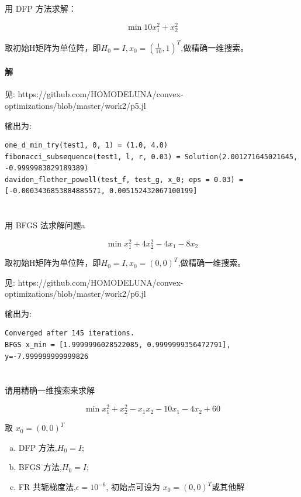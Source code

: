 \documentclass[a4paper]{article}
\begin{document}
\section{}

用 DFP 方法求解：

\[\min 10x_1^2 + x_2^2\]

取初始H矩阵为单位阵，即$H_0 = I, x_0 = (\frac{1}{10},1)^T$,做精确一维搜索。

\paragraph{解}

见: https://github.com/HOMODELUNA/convex-optimizations/blob/master/work2/p5.jl

输出为:
\begin{lstlisting}
one_d_min_try(test1, 0, 1) = (1.0, 4.0)
fibonacci_subsequence(test1, l, r, 0.03) = Solution(2.001271645021645, -0.9999983829189389)
davidon_flether_powell(test_f, test_g, x_0; eps = 0.03) = [-0.0003436853884885571, 0.005152432067100199]
\end{lstlisting}

\section{}

用 BFGS 法求解问题a

\[\min x_1^2 + 4x_2^2 - 4x_1 -8x_2\]

取初始H矩阵为单位阵，即$H_0 = I, x_0 = (0,0)^T$,做精确一维搜索。


见: https://github.com/HOMODELUNA/convex-optimizations/blob/master/work2/p6.jl

输出为:
\begin{lstlisting}
Converged after 145 iterations.
BFGS x_min = [1.9999996028522085, 0.9999999356472791], y=-7.999999999999826
\end{lstlisting}

\section{}

请用精确一维搜索来求解

\[\min x_1^2 + x_2^2 - x_1x_2 -10x_1 - 4x_2 + 60\]

取 $x_0 = (0,0)^T$

\begin{enumerate}[(a)]
    \item DFP 方法,$H_0 = I$;
    \item BFGS 方法,$H_0 = I$;
    \item FR 共轭梯度法,$\epsilon = 10^{-6}$, 初始点可设为 $x_0 = (0,0)^T$或其他解
\end{enumerate}
\end{document}
